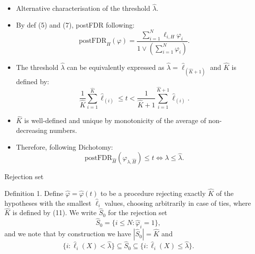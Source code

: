 \documentclass[10pt, aspectratio=169]{beamer}
\begin{document}
\begin{frame}
    \begin{itemize}[label=\scalebox{0.5}{$\bullet$}]
        \item Alternative characterisation of the threshold \( \hat{\lambda} \).
        \item By def (5) and (7), postFDR following: 
        \begin{equation}
            \text{postFDR}_H(\varphi) = \frac{\sum_{i=1}^{N} \ell_{i,H} \varphi_i}{1 \lor (\sum_{i=1}^{N} \varphi_i)}. \tag{10}
        \end{equation}
        \item The threshold \( \hat{\lambda} \) can be equivalently expressed as \( \hat{\lambda} = \hat{\ell}_{(\hat{K}+1)} \) and \( \hat{K} \) is defined by:
        \begin{equation}
            \frac{1}{\hat{K}} \sum_{i=1}^{\hat{K}} \hat{\ell}_{(i)} \leq t < \frac{1}{\hat{K}+1} \sum_{i=1}^{\hat{K}+1} \hat{\ell}_{(i)}. \tag{11}
        \end{equation}
        \item \( \hat{K} \) is well-defined and unique by monotonicity of the average of non-decreasing numbers.
        \item Therefore, following Dichotomy:
        \begin{equation}
            \text{postFDR}_{\hat{H}}(\varphi_{\lambda, \hat{H}}) \leq t \iff \lambda \leq \hat{\lambda}. \tag{12}
        \end{equation}
    \end{itemize}
\end{frame}
\begin{frame}{Rejection set}
    \begin{mydefbox}{Definition 1.}
        Define \( \hat{\varphi} = \hat{\varphi}(t) \) to be a procedure rejecting exactly \( \hat{K} \) of the hypotheses with the smallest \( \hat{\ell}_i \) values, choosing arbitrarily in case of ties, where \( \hat{K} \) is defined by (11). We write \( \hat{S}_0 \) for the rejection set
        \[
        \hat{S}_0 = \{i \leq N : \hat{\varphi}_i = 1\},
        \]
        and we note that by construction we have \( |\hat{S}_0| = \hat{K} \) and
        \[
        \{i : \hat{\ell}_i(X) < \hat{\lambda} \} \subseteq \hat{S}_0 \subseteq \{i : \hat{\ell}_i(X) \leq \hat{\lambda} \}.
        \]
    \end{mydefbox}
\end{frame}
\end{document}
